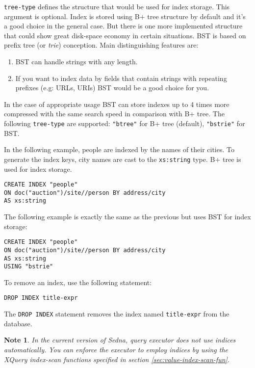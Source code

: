 \documentclass[a4paper,12pt]{article}
\newtheorem{note}{Note}    %
\begin{document}
\verb!tree-type! defines the structure that would be used for index storage.
This argument is optional. Index is stored using B+ tree structure by default
and it's a good choice in the general case. But there is one more implemented
structure that could show great disk-space economy in certain situations. BST is
based on prefix tree (or \emph{trie}) conception. Main distinguishing features
are:
\begin{enumerate}
\item {BST can handle strings with any length.}
\item {If you want  to index data by fields that contain strings with repeating
prefixes (e.g: URLs, URIs) BST would be a good choice for you.}
\end{enumerate}
In the case of appropriate usage BST can store indexes up to 4 times more
compressed with the same search speed in comparison with B+ tree.
The following \verb!tree-type! are supported: \verb!"btree"! for B+ tree (default),
\verb!"bstrie"! for BST.


In the following example, people are indexed by the names of their cities. To
generate the index keys, city names are cast to the \verb!xs:string! type. B+
tree is used for index storage.

\begin{verbatim}
CREATE INDEX "people"
ON doc("auction")/site//person BY address/city
AS xs:string
\end{verbatim}

The following example is exactly the same as the previous but uses BST for index
storage:

\begin{verbatim}
CREATE INDEX "people"
ON doc("auction")/site//person BY address/city
AS xs:string
USING "bstrie"
\end{verbatim}


To remove an index, use the following statement:
\begin{verbatim}
DROP INDEX title-expr
\end{verbatim}

The \verb!DROP INDEX! statement removes the index named \verb!title-expr! from
the database.

\begin{note} In the current version of Sedna, query executor does not use
indices automatically. You can enforce the executor to employ indices by using
the XQuery index-scan functions specified in section
\ref{sec:value-index-scan-fun}.
\end{note}
\end{document}

